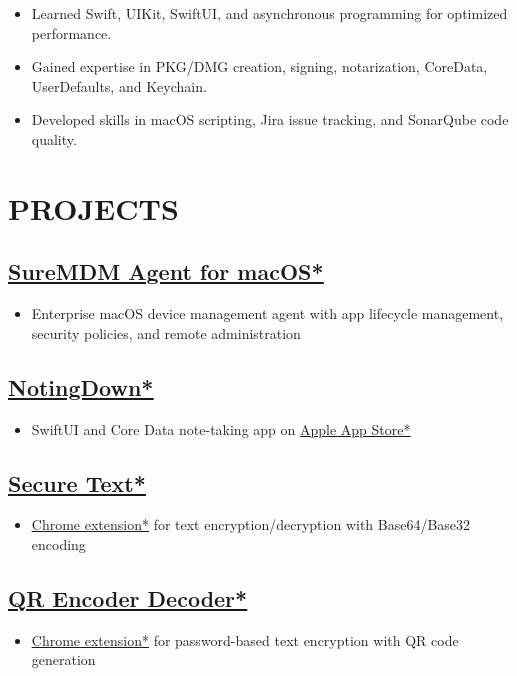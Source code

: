 \documentclass[11pt,a4paper]{moderncv}
\let\oldhref\href
\renewcommand{\href}[2]{\oldhref{#1}{\underline{#2}}}
\begin{document}
\begin{minipage}[t]{0.62\textwidth}
\begin{itemize}
    \item Learned Swift, UIKit, SwiftUI, and asynchronous programming for optimized performance.
    \item Gained expertise in PKG/DMG creation, signing, notarization, CoreData, UserDefaults, and Keychain.
    \item Developed skills in macOS scripting, Jira issue tracking, and SonarQube code quality.
\end{itemize}

\section{PROJECTS}
\subsection{\href{https://www.42gears.com/products/mobile-device-management/suremdm-agent-for-macos-past-releases/}{SureMDM Agent for macOS*}}
\begin{itemize}
    \item Enterprise macOS device management agent with app lifecycle management, security policies, and remote administration
\end{itemize}

\subsection{\href{https://github.com/sachin6174/NotingDown}{NotingDown*}}
\begin{itemize}
    \item SwiftUI and Core Data note-taking app on \href{https://apps.apple.com/us/app/notingdown/id123456789}{Apple App Store*}
\end{itemize}

\subsection{\href{https://github.com/sachin6174/SecureText}{Secure Text*}}
\begin{itemize}
    \item \href{https://chrome.google.com/webstore/detail/secure-text/id123456789}{Chrome extension*} for text encryption/decryption with Base64/Base32 encoding
\end{itemize}

\subsection{\href{https://github.com/sachin6174/QREncoderDecoder}{QR Encoder Decoder*}}
\begin{itemize}
    \item \href{https://chrome.google.com/webstore/detail/qr-encoder-decoder/id123456789}{Chrome extension*} for password-based text encryption with QR code generation
\end{itemize}

\end{minipage}
\end{document}
